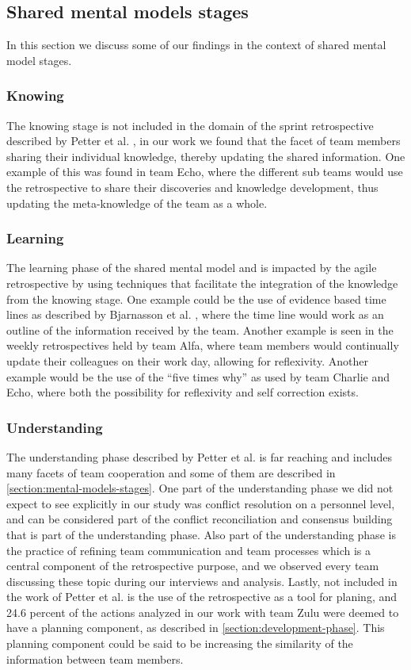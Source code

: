 \subsection{Shared mental models stages}
In this section we discuss some of our findings in the context of shared mental model stages.

\subsubsection{Knowing}
The knowing stage is not included in the domain of the sprint retrospective described by Petter et al. \cite{Petter2013}, in our work we found that the facet of team members sharing their individual knowledge, thereby updating the shared information. One example of this was found in team Echo, where the different sub teams would use the retrospective to share their discoveries and knowledge development, thus updating the meta-knowledge of the team as a whole. 

\subsubsection{Learning}
The learning phase of the shared mental model and is impacted by the agile retrospective by using techniques that facilitate the integration of the knowledge from the knowing stage. One example could be the use of evidence based time lines as described by Bjarnasson et al. \cite{Bjarnason2012}, where the time line would work as an outline of the information received by the team. Another example is seen in the weekly retrospectives held by team Alfa, where team members would continually update their colleagues on their work day, allowing for reflexivity. Another example would be the use of the ``five times why'' as used by team Charlie and Echo, where both the possibility for reflexivity and self correction exists.
 
\subsubsection{Understanding}
The understanding phase described by Petter et al. \cite{Petter2013} is far reaching and includes many facets of team cooperation and some of them are described in \autoref{section:mental-models-stages}. One part of the understanding phase we did not expect to see explicitly in our study was conflict resolution on a personnel level, and can be considered part of the conflict reconciliation and consensus building that is part of the understanding phase. Also part of the understanding phase is the practice of refining team communication and team processes which is a central component of the retrospective purpose, and we observed every team discussing these topic during our interviews and analysis. Lastly, not included in the work of Petter et al. is the use of the retrospective as a tool for planing, and 24.6 percent of the actions analyzed in our work with team Zulu were deemed to have a planning component, as described in \autoref{section:development-phase}. This planning component could be said to be increasing the similarity of the information between team members.

